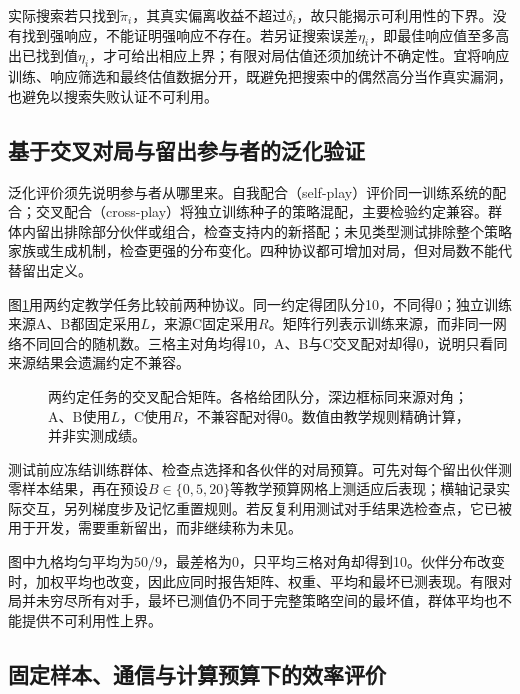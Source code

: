 实际搜索若只找到$\tilde\pi_i$，其真实偏离收益不超过$\delta_i$，故只能揭示可利用性的下界。没有找到强响应，不能证明强响应不存在。若另证搜索误差$\eta_i$，即最佳响应值至多高出已找到值$\eta_i$，才可给出相应上界；有限对局估值还须加统计不确定性。宜将响应训练、响应筛选和最终估值数据分开，既避免把搜索中的偶然高分当作真实漏洞，也避免以搜索失败认证不可利用。

\subsection{基于交叉对局与留出参与者的泛化验证}
\label{sec:rl-multi-agent-cross-play}

泛化评价须先说明参与者从哪里来。自我配合（self-play）评价同一训练系统的配合；交叉配合（cross-play）将独立训练种子的策略混配，主要检验约定兼容。群体内留出排除部分伙伴或组合，检查支持内的新搭配；未见类型测试排除整个策略家族或生成机制，检查更强的分布变化。四种协议都可增加对局，但对局数不能代替留出定义。

图\ref{fig:rl-multi-agent-cross-play}用两约定教学任务比较前两种协议。同一约定得团队分10，不同得0；独立训练来源A、B都固定采用$L$，来源C固定采用$R$。矩阵行列表示训练来源，而非同一网络不同回合的随机数。三格主对角均得10，A、B与C交叉配对却得0，说明只看同来源结果会遗漏约定不兼容。

\begin{figure}[htbp]
 \centering
 
 \caption{两约定任务的交叉配合矩阵。各格给团队分，深边框标同来源对角；A、B使用$L$，C使用$R$，不兼容配对得0。数值由教学规则精确计算，并非实测成绩。}
 \label{fig:rl-multi-agent-cross-play}
\end{figure}

测试前应冻结训练群体、检查点选择和各伙伴的对局预算。可先对每个留出伙伴测零样本结果，再在预设$B\in\{0,5,20\}$等教学预算网格上测适应后表现；横轴记录实际交互，另列梯度步及记忆重置规则。若反复利用测试对手结果选检查点，它已被用于开发，需要重新留出，而非继续称为未见。

图中九格均匀平均为$50/9$，最差格为0，只平均三格对角却得到10。伙伴分布改变时，加权平均也改变，因此应同时报告矩阵、权重、平均和最坏已测表现。有限对局并未穷尽所有对手，最坏已测值仍不同于完整策略空间的最坏值，群体平均也不能提供不可利用性上界。

\subsection{固定样本、通信与计算预算下的效率评价}
\label{sec:rl-multi-agent-efficiency}

